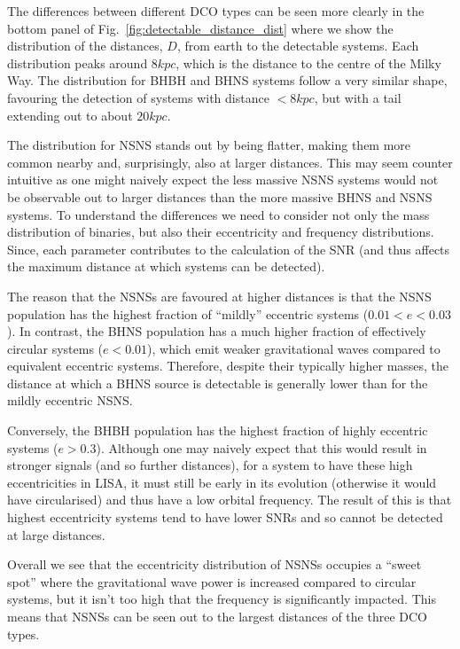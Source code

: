 The differences between different DCO types can be seen more clearly in the bottom panel of Fig.~\ref{fig:detectable_distance_dist} where we show the distribution of the distances, $D$, from earth to the detectable systems. Each distribution peaks around $8\unit{kpc}$, which is the distance to the centre of the Milky Way. The distribution for BHBH and BHNS systems follow a very similar shape, favouring the detection of systems with distance $<8\unit{kpc}$, but with a tail extending out to about $20\unit{kpc}$.

The distribution for NSNS stands out by being flatter, making them more common nearby and, surprisingly, also at larger distances. This may seem counter intuitive as one might naively expect the less massive NSNS systems would not be observable out to larger distances than the more massive BHNS and NSNS systems. To understand the differences we need to consider not only the mass distribution of binaries, but also their eccentricity and frequency distributions. Since, each parameter contributes to the calculation of the SNR (and thus affects the maximum distance at which systems can be detected).

The reason that the NSNSs are favoured at higher distances is that the NSNS population has the highest fraction of ``mildly'' eccentric systems ($0.01 < e < 0.03$). In contrast, the BHNS population has a much higher fraction of effectively circular systems ($e < 0.01$), which emit weaker gravitational waves compared to equivalent eccentric systems. Therefore, despite their typically higher masses, the distance at which a BHNS source is detectable is generally lower than for the mildly eccentric NSNS.

Conversely, the BHBH population has the highest fraction of highly eccentric systems ($e > 0.3$). Although one may naively expect that this would result in stronger signals (and so further distances), for a system to have these high eccentricities in LISA, it must still be early in its evolution (otherwise it would have circularised) and thus have a low orbital frequency. The result of this is that highest eccentricity systems tend to have lower SNRs and so cannot be detected at large distances. 

Overall we see that the eccentricity distribution of NSNSs occupies a ``sweet spot'' where the gravitational wave power is increased compared to circular systems, but it isn't too high that the frequency is significantly impacted. This means that NSNSs can be seen out to the largest distances of the three DCO types.

